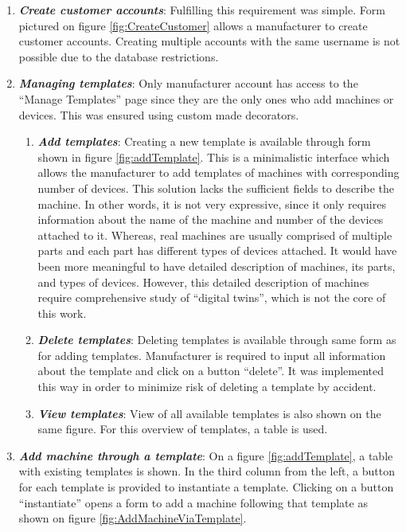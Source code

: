 \begin{enumerate}
	\setlength{\itemsep}{1pt}
	\item \textbf{\textit{Create customer accounts}}: Fulfilling this requirement was simple. Form pictured on figure \ref{fig:CreateCustomer} allows a manufacturer to create customer accounts. Creating multiple accounts with the same username is not possible due to the database restrictions.

	\item \textbf{\textit{Managing templates}}: Only manufacturer account has access to the ``Manage Templates'' page since they are the only ones who add machines or devices. This was ensured using custom made decorators.

	\begin{enumerate}
		\item \textbf{\textit{Add templates}}: Creating a new template is available through form shown in figure \ref{fig:addTemplate}. This is a minimalistic interface which allows the manufacturer to add templates of machines with corresponding number of devices. This solution lacks the sufficient fields to describe the machine. In other words, it is not very expressive, since it only requires information about the name of the machine and number of the devices attached to it. Whereas, real machines are usually comprised of multiple parts and each part has different types of devices attached. It would have been more meaningful to have detailed description of machines, its parts, and types of devices. However, this detailed  description of machines require comprehensive study of ``digital twins'', which is not the core of this work.

		\item \textbf{\textit{Delete templates}}: Deleting templates is available through same form as for adding templates. Manufacturer is required to input all information about the template and click on a button ``delete''. It was implemented this way in order to minimize risk of deleting a template by accident.
		\item \textbf{\textit{View templates}}: View of all available templates is also shown on the same figure. For this overview of templates, a table is used.  
	\end{enumerate}

	\item \textbf{\textit{Add machine through a template}}: On a figure \ref{fig:addTemplate}, a table with existing templates is shown. In the third column from the left, a button for each template is provided to instantiate a template. Clicking on a button ``instantiate'' opens a form to add a machine following that template as shown on figure \ref{fig:AddMachineViaTemplate}.


\end{enumerate}
